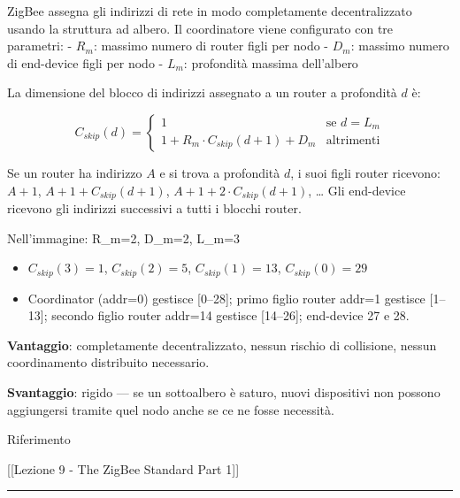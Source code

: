 \documentclass[
  italian,
  openany]{book}
\providecommand{\tightlist}{%
  \setlength{\itemsep}{0pt}\setlength{\parskip}{0pt}}
\begin{document}
ZigBee assegna gli indirizzi di rete in modo completamente
decentralizzato usando la struttura ad albero. Il coordinatore viene
configurato con tre parametri: - \(R_m\): massimo numero di router figli
per nodo - \(D_m\): massimo numero di end-device figli per nodo -
\(L_m\): profondità massima dell'albero

La dimensione del blocco di indirizzi assegnato a un router a profondità
\(d\) è:

\[C_{skip}(d) = \begin{cases} 1 & \text{se } d = L_m \\ 1 + R_m \cdot C_{skip}(d+1) + D_m & \text{altrimenti} \end{cases}\]

Se un router ha indirizzo \(A\) e si trova a profondità \(d\), i suoi
figli router ricevono: \(A+1\), \(A+1+C_{skip}(d+1)\),
\(A+1+2 \cdot C_{skip}(d+1)\), \ldots{} Gli end-device ricevono gli
indirizzi successivi a tutti i blocchi router.

\begin{callouttip}{Nell’immagine: R\_m=2, D\_m=2, L\_m=3}

\begin{itemize}
\tightlist
\item
  \(C_{skip}(3)=1\), \(C_{skip}(2)=5\), \(C_{skip}(1)=13\),
  \(C_{skip}(0)=29\)
\item
  Coordinator (addr=0) gestisce {[}0--28{]}; primo figlio router addr=1
  gestisce {[}1--13{]}; secondo figlio router addr=14 gestisce
  {[}14--26{]}; end-device 27 e 28.
\end{itemize}

\end{callouttip}

\textbf{Vantaggio}: completamente decentralizzato, nessun rischio di
collisione, nessun coordinamento distribuito necessario.

\textbf{Svantaggio}: rigido --- se un sottoalbero è saturo, nuovi
dispositivi non possono aggiungersi tramite quel nodo anche se ce ne
fosse necessità.

\begin{calloutnote}{Riferimento}

{[}{[}Lezione 9 - The ZigBee Standard Part 1{]}{]}

\end{calloutnote}

\begin{center}\rule{0.5\linewidth}{0.5pt}\end{center}
\end{document}
